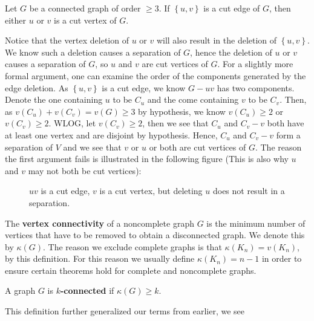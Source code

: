  \begin{problem}
	Let $G$ be a connected graph of order $\ge 3$. If $\left\{  u, v \right\} $ is a cut edge of $G$, then either $u$ or $ v$ is a cut vertex of $G$.
\end{problem}
 \begin{solution}
	 Notice that the vertex deletion of $u$ or $v$ will also result in the deletion of $\left\{ u, v \right\} $. We know such a deletion causes a separation of $G$, hence the deletion of $u$ or $v$ causes a separation of $G$, so $u$ and $v$ are cut vertices of $G$. For a slightly more formal argument, one can examine the order of the components generated by the edge deletion. As  $\left\{ u, v \right\} $ is a cut edge, we know $G - uv$ has two components. Denote the one containing $u$ to be $C_{u}$ and the come containing $v$ to be $C_{v}$. Then, as $v\left( C_{u} \right) + v\left( C_{v} \right) = v\left( G \right) \ge 3$ by hypothesis, we know $v\left( C_{u} \right) \ge 2$ or $v\left( C_{v} \right) \ge 2$. WLOG, let $v\left( C_{v} \right) \ge 2$, then we see that $C_{u}$ and $C_{v} - v$ both have at least one vertex and are disjoint by hypothesis. Hence,  $C_{u}$ and $C_{v} - v$ form a separation of $V$ and we see that $v$ or $u$ or both are cut vertices of $G$. The reason the first argument fails is illustrated in the following figure (This is also why $u$ and $v$ may not both be cut vertices):
\begin{figure}[ht]
    \centering
    \caption{$uv$ is a cut edge, $v$ is a cut vertex, but deleting $u$ does not result in a separation.}
    \label{fig:cutvertthm2}
\end{figure}
\end{solution}
\begin{definition}
	The \textbf{vertex connectivity} of a noncomplete graph $G$ is the minimum number of vertices that have to be removed to obtain a disconnected graph. We denote this by $\kappa \left( G \right) $. The reason we exclude complete graphs is that $\kappa \left( K_{n} \right) = v\left( K_{n} \right) $, by this definition. For this reason we usually define $\kappa \left( K_{n} \right)  = n-1$ in order to ensure certain theorems hold for complete and noncomplete graphs.
\end{definition}
\begin{definition}[k-Connectivity]
	A graph $G$ is  \textbf{$k$-connected}	if $\kappa \left( G \right)  \ge k$.
\end{definition}
This definition further generalized our terms from earlier, we see
